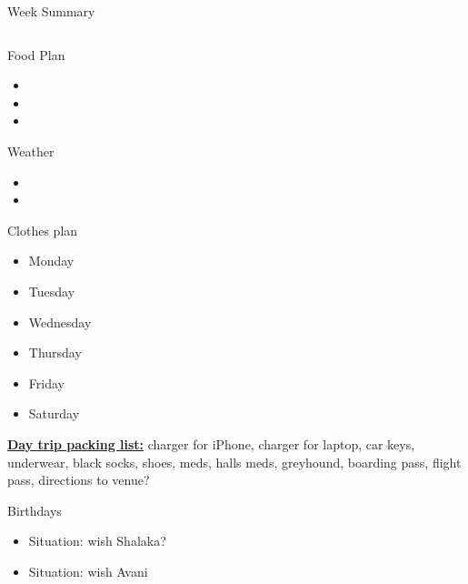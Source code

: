 \documentclass[serif, mathserif, final]{beamer}
\begin{document}
\begin{frame}
\begin{columns}
\begin{column}{0.5\linewidth}
\begin{block}{Week Summary}
      \begin{column}{0.25\linewidth}
        
        \begin{block}{Food Plan} 
          \begin{itemize}
            \tiny \item \tiny 
          \item \tiny 
          \item \tiny 
          \end{itemize}
        \end{block} 
        
        \begin{block}{Weather}
          \begin{itemize}
            \tiny \item \tiny 
          \item \tiny
          \end{itemize}
        \end{block} 

      \begin{block}{Clothes plan} 
        \begin{itemize}
          \tiny \item \tiny Monday
        \item \tiny Tuesday
        \item \tiny Wednesday
        \item \tiny Thursday
        \item \tiny Friday
          \item \tiny Saturday
        \end{itemize} 
      \end{block}



      \textbf{\underline{Day trip packing list:}} charger for iPhone, charger for laptop,
      car keys, underwear, black socks, shoes, meds, halls meds, greyhound,
      boarding pass, flight pass, directions to venue? \\ 

      \begin{block} {Birthdays}       
        \begin{itemize} 
        \tiny  \item \tiny Situation: wish Shalaka? 
        \item \tiny Situation: wish Avani 
        \end{itemize} 
      \end{block} 


\end{column}
\end{block}
\end{column}
\end{columns}
\end{frame}
\end{document}
